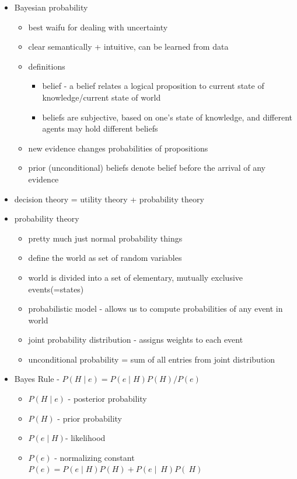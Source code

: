 \documentclass[11pt]{article}
\newcommand{\ee}[1]{\ensuremath{#1}}
\begin{document}
\begin{description}
\begin{itemize}
\begin{itemize}
\begin{itemize}
\begin{itemize}
			\end{itemize}
		\end{itemize}
	
		\item Bayesian probability
		\begin{itemize}
			\item best waifu for dealing with uncertainty
			\item clear semantically + intuitive, can be learned from data
			\item definitions
			\begin{itemize}
				\item belief - a belief relates a logical proposition to current state of knowledge/current state of world
				\item beliefs are subjective, based on one's state of knowledge, and different agents may hold different beliefs
			\end{itemize}
		
			\item new evidence changes probabilities of propositions
			
			\item prior (unconditional) beliefs denote belief before the arrival of any evidence
			
		\end{itemize}
	
		\item decision theory = utility theory + probability theory

		\item probability theory
		\begin{itemize}
			\item pretty much just normal probability things
			\item define the world as set of random variables
			\item world is divided into a set of elementary, mutually exclusive events(=states)
			\item probabilistic model - allows us to compute probabilities of any event in world
			\item joint probability distribution - assigns weights to each event
			\item unconditional probability = sum of all entries from joint distribution
		\end{itemize}
	
		\item Bayes Rule - \ee{P(H \mid e) = P(e \mid H) P(H)/P(e)}
		\begin{itemize}
			\item \ee{P(H\mid e)} - posterior probability
			\item \ee{P(H)} - prior probability
			\item \ee{P(e\mid H) }- likelihood
			\item \ee{P(e)} - normalizing constant
			\subitem \ee{P(e) = P(e \mid H) P(H) + P(e \mid ~H) P(~H)}
		\end{itemize}
	\end{itemize}
\end{itemize}


\end{description}
\end{document}
